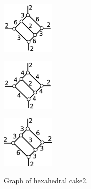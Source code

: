 \documentclass[suppldata, dvipdfmx]{interact}
\theoremstyle{plain}%
\theoremstyle{definition}
\theoremstyle{remark}
\theoremstyle{problemstyle}
\begin{document}
\begin{figure}[h!tbp]
  \begin{minipage}[t]{0.23\textwidth}
   \centering
   \includegraphics[width=1in,
   keepaspectratio]{./img/HexahedraWithSphericalFaces/hexahedralCake2/a.jpg}
   \subcaption{}
   \label{fig:cake2a}
  \end{minipage}
  \hspace*{\fill}
  \begin{minipage}[t]{0.23\textwidth}
   \centering
   \includegraphics[width=1in, keepaspectratio]{./img/HexahedraWithSphericalFaces/hexahedralCake2/b.jpg}
   \subcaption{}
   \label{fig:cake2b}
  \end{minipage}
 \hspace*{\fill}
  \begin{minipage}[t]{0.23\textwidth}
   \centering
   \includegraphics[width=1in, keepaspectratio]{./img/HexahedraWithSphericalFaces/hexahedralCake2/c.jpg}
   \subcaption{}
   \label{fig:cake2c}
  \end{minipage}
 \hspace*{\fill}
  \caption{Graph of hexahedral cake2.}
  \label{fig:cake2List}
\end{figure}
\end{document}
